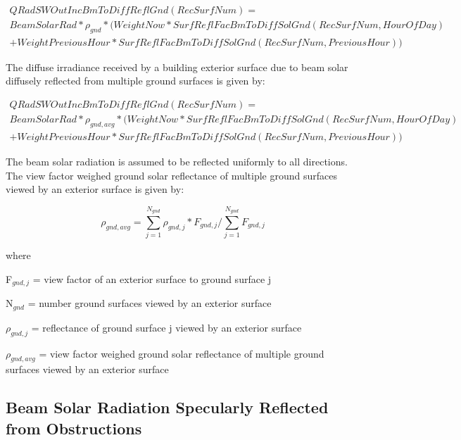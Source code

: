 \begin{equation}
\begin{split}
QRadSWOutIncBmToDiffReflGnd(RecSurfNum) =
\\BeamSolarRad * {\rho_{gnd}} * (WeightNow * SurfReflFacBmToDiffSolGnd(RecSurfNum,HourOfDay)
\\+ WeightPreviousHour * SurfReflFacBmToDiffSolGnd(RecSurfNum,PreviousHour))
\end{split}
\end{equation}

The diffuse irradiance received by a building exterior surface due to beam solar diffusely reflected from multiple ground surfaces is given by:

\begin{equation}
\begin{split}
QRadSWOutIncBmToDiffReflGnd(RecSurfNum) =
\\BeamSolarRad * {\rho_{gnd, avg}} * (WeightNow * SurfReflFacBmToDiffSolGnd(RecSurfNum,HourOfDay)
\\+ WeightPreviousHour * SurfReflFacBmToDiffSolGnd(RecSurfNum,PreviousHour))
\end{split}
\end{equation}

The beam solar radiation is assumed to be reflected uniformly to all directions. The view factor weighed ground solar reflectance of multiple ground surfaces viewed by an exterior surface is given by:

\begin{equation}
{\rho_{gnd,avg}} = \sum\limits_{j = 1}^{{N_{gnd}}} {\rho_{gnd,j}} * {F_{gnd,j}} / \sum\limits_{j = 1}^{{N_{gnd}}} {F_{gnd,j}}
\end{equation}

where

F\(_{gnd,j}\) = view factor of an exterior surface to ground surface j

N\(_{gnd}\) = number ground surfaces viewed by an exterior surface

\({\rho_{gnd,j}}\) = reflectance of ground surface j viewed by an exterior surface

\({\rho_{gnd,avg}}\) = view factor weighed ground solar reflectance of multiple ground surfaces viewed by an exterior surface


\subsection{Beam Solar Radiation Specularly Reflected from Obstructions}\label{beam-solar-radiation-specularly-reflected-from-obstructions}

